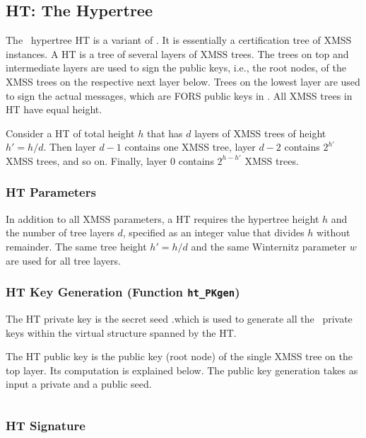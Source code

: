 \subsection{HT: The Hypertree}

The \SPHINCSA\ hypertree HT is a variant of \XMSSMT. It is essentially a certification tree of XMSS instances. A HT is a tree of several layers of XMSS trees. The trees on top and intermediate layers are used to sign the public keys, i.e., the root nodes, of the XMSS trees on the respective next layer below. Trees on the lowest layer are used to sign the actual messages, which are FORS public keys in \SPHINCSA. All XMSS trees in HT have equal height.

Consider a HT of total height $h$ that has $d$ layers of XMSS trees of height $h'=h/d$. Then layer $d-1$ contains one XMSS tree, layer $d-2$ contains $2^{h'}$ XMSS trees, and so on. Finally, layer $0$ contains $2^{h-h'}$ XMSS trees.

\subsubsection{HT Parameters}
\label{sec:htpara}
In addition to all XMSS parameters, a HT requires the hypertree height $h$ and the number of tree layers $d$, specified as an integer value that divides $h$ without remainder. The same tree height $h'=h/d$ and the same Winternitz parameter $w$ are used for all tree layers.


\subsubsection{HT Key Generation (Function \texttt{ht\_PKgen})}

The HT private key is the secret seed \sk.\seed which is used to generate all the \WOTSCS\ private keys within the virtual structure spanned by the HT.

The HT public key is the public key (root node) of the single XMSS tree on the top layer. Its computation is explained below. The public key generation takes as input a private and a public seed.

\begin{algorithm}
\inputminted[breaklines,linenos,tabsize=2,mathescape,escapeinside=||]{C}{code/ht_PKgen.cs}
\caption{\texttt{ht\_PKgen} --- Generating an HT public key.}
\label{alg:htpkgen}
\end{algorithm}
\subsubsection{HT Signature}

